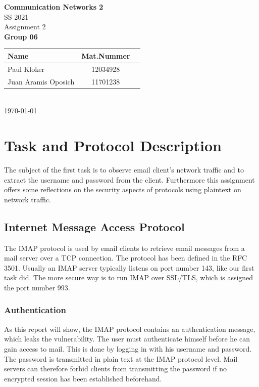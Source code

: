 \documentclass[parskip=full]{scrartcl}
\begin{document}
\begin{titlepage}
    \centering
    \vspace*{2cm}
    {\Huge \textbf{Communication Networks 2}}\\
    SS 2021\\
    \vspace*{1cm}
    {\Large Assignment 2}
    \\\vspace*{3cm}
    {\Large \textbf{Group 06}}\\
    \vspace*{1cm}
    {\large 
        \begin{tabular}{l c c}
            Name & Mat.Nummer \\ \hline
            Paul Kloker & 12034928 \\
            Juan Aramis Oposich & 11701238
        \end{tabular}
    }
    \\\vspace*{7cm}
    \today
\end{titlepage}

\section{Task and Protocol Description} \label{sec:task}

The subject of the first task is to observe email client’s network traffic and to extract the username and password from the client.  Furthermore this assignment offers some reflections on the security aspects of protocols using plaintext on network traffic.

\subsection{Internet Message Access Protocol}
The IMAP protocol is used by email clients to retrieve email messages from a mail server over a TCP connection. The protocol has been defined in the RFC 3501. Usually an IMAP server typically listens on port number 143, like our first task did. The more secure way is to run IMAP over SSL/TLS, which is assigned the port number 993.

\subsubsection{Authentication}
As this report will show, the IMAP protocol contains an authentication message, which leaks the vulnerability. The user must authenticate himself before he can gain access to mail. This is done by logging in with his username and password. The password is transmitted in plain text at the IMAP protocol level. Mail servers can therefore forbid clients from transmitting the password if no encrypted session has been established beforehand.\\
\end{document}
